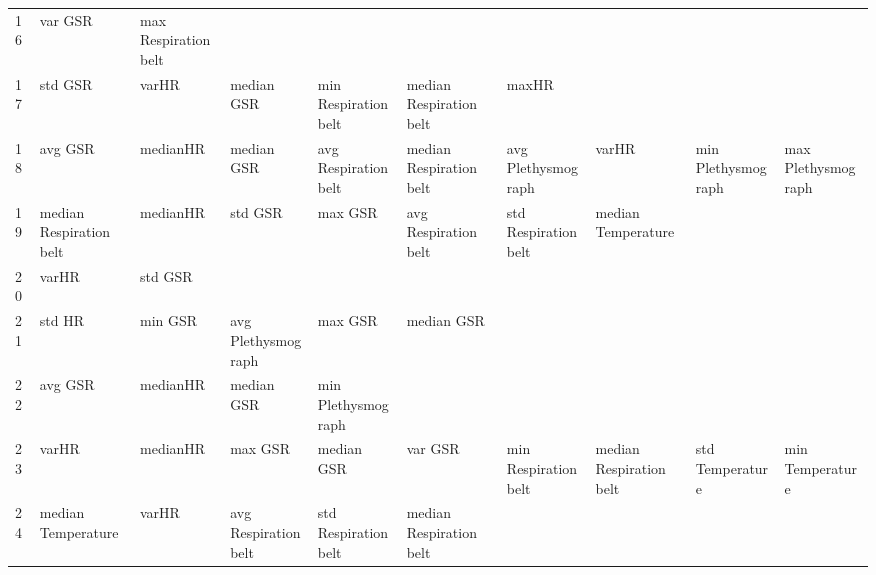 \begin{landscape}
\begin{table}[]
\begin{tabular}{l|llllllll}
16       & var GSR                 & max Respiration belt    &                         &                         &                         &                       &                         &                         &                         &         \\
17       & std GSR                 & varHR                   & median GSR              & min Respiration belt    & median Respiration belt & maxHR                 &                         &                         &                         &         \\
18       & avg GSR                 & medianHR                & median GSR              & avg Respiration belt    & median Respiration belt & avg Plethysmograph    & varHR                   & min Plethysmograph      & max Plethysmograph      &         \\
19       & median Respiration belt & medianHR                & std GSR                 & max GSR                 & avg Respiration belt    & std Respiration belt  & median Temperature      &                         &                         &         \\
20       & varHR                   & std GSR                 &                         &                         &                         &                       &                         &                         &                         &         \\
21       & std HR                  & min GSR                 & avg Plethysmograph      & max GSR                 & median GSR              &                       &                         &                         &                         &         \\
22       & avg GSR                 & medianHR                & median GSR              & min Plethysmograph      &                         &                       &                         &                         &                         &         \\
23       & varHR                   & medianHR                & max GSR                 & median GSR              & var GSR                 & min Respiration belt  & median Respiration belt & std Temperature         & min Temperature         &         \\
24       & median Temperature      & varHR                   & avg Respiration belt    & std Respiration belt    & median Respiration belt &                       &                         &                         &                         &         \\

\end{tabular}
\end{table}
\end{landscape}
